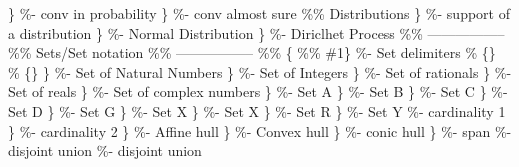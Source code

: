 \documentclass[a4paper]{article}
\begin{document}
\newcommand{\convprob}\{\}                   \%- conv in probability
\newcommand{\convas}\{\}                  \%- conv almost sure
\%\% Distributions
\newcommand{\supp}\{\}                                    \%- support of a distribution
\newcommand{\No}\{\}                                      \%- Normal Distribution
\newcommand{\DP}\{\}                           \%- Diriclhet Process
\%\% -----------------
\%\% Sets/Set notation
\%\% -----------------
\%\% \DeclarePairedDelimiterX*\set[1]\lbrace\rbrace\{
\%\%                          \def\given{\;\delimsize\vert\;}\#1\}        \%- Set delimiters
\newcommand{\set}[1]{\Big\lbrace #1 \Big\rbrace}\%     \{\}
\newcommand{\setrl}[1]{\left\lbrace #1 \right\rbrace}\%     \{\}
\newcommand{\N}\{\}                                        \%- Set of Natural Numbers
\newcommand{\Z}\{\}                                        \%- Set of Integers
\newcommand{\Q}\{\}                                        \%- Set of rationals
\newcommand{\R}\{\}                                        \%- Set of reals
\newcommand{\Co}\{\}                                        \%- Set of complex numbers
\newcommand{\A}\{\}									   \%- Set  A
\newcommand{\B}\{\}									   \%- Set  B
\newcommand{\C}\{\}									   \%- Set  C
\newcommand{\D}\{\}									   \%- Set  D
\newcommand{\G}\{\}									   \%- Set  G
\newcommand{\X}\{\}									   \%- Set  X
\newcommand{\Zs}\{\}									   \%- Set  X
\newcommand{\Rs}\{\}									   \%- Set  R
\newcommand{\Y}\{\}									   \%- Set  Y
\newcommand{\card}[1]{\left|#1\right|}                             \%- cardinality 1
\newcommand{\cardi}\{\}                             \%- cardinality 2
\newcommand{\aff}\{\}                                        \%- Affine hull
\newcommand{\conv}\{\}                                        \%- Convex hull
\newcommand{\coni}\{\}                                        \%- conic hull
\newcommand{\span}\{\}                                        \%- span
\newcommand{\union}{\bigcup}                                        \%- disjoint union
\newcommand{\dunion}{\bigsqcup}                                        \%- disjoint union
\end{document}
